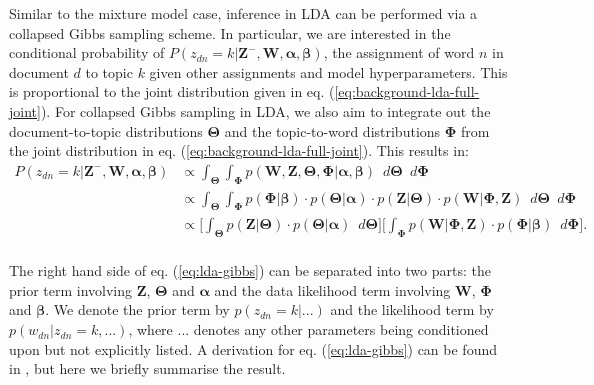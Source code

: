 Similar to the mixture model case, inference in LDA can be performed via a collapsed Gibbs sampling scheme. In particular, we are interested in the conditional probability of $P({z}_{dn}=k \vert \boldsymbol{Z}^{-}, \boldsymbol{W}, \boldsymbol{\alpha}, \boldsymbol{\beta})$, the assignment of word $n$ in document $d$ to topic $k$ given other assignments and model hyperparameters. This is proportional to the joint distribution given in eq. (\ref{eq:background-lda-full-joint}). For collapsed Gibbs sampling in LDA, we also aim to integrate out the document-to-topic distributions $\boldsymbol{\Theta}$ and the topic-to-word distributions $\boldsymbol{\Phi}$ from the joint distribution in eq. (\ref{eq:background-lda-full-joint}). This results in: 
\begin{equation}
\begin{aligned}
P({z}_{dn}=k \vert \boldsymbol{Z}^{-}, \boldsymbol{W}, \boldsymbol{\alpha}, \boldsymbol{\beta}) &\propto \int_{\boldsymbol{\Theta}} \int_{\boldsymbol{\Phi}} p(\boldsymbol{W}, \boldsymbol{Z}, \boldsymbol{\Theta}, \boldsymbol{\Phi} \vert \boldsymbol{\alpha}, \boldsymbol{\beta}) \enspace d\boldsymbol{\Theta} \enspace d\boldsymbol{\Phi} \\
                                                                                                                                                    &\propto \int_{\boldsymbol{\Theta}} \int_{\boldsymbol{\Phi}} p(\boldsymbol{\Phi} \vert \boldsymbol{\beta}) \cdot p(\boldsymbol{\Theta} \vert \boldsymbol{\alpha}) \cdot p(\boldsymbol{Z} \vert \boldsymbol{\Theta}) \cdot  p(\boldsymbol{W} \vert \boldsymbol{\Phi}, \boldsymbol{Z}) \enspace d\boldsymbol{\Theta} \enspace d\boldsymbol{\Phi} \\
                                                                                                                                                    &\propto \Bigg[ \int_{\boldsymbol{\Theta}}  p(\boldsymbol{Z} \vert \boldsymbol{\Theta}) \cdot p(\boldsymbol{\Theta} \vert \boldsymbol{\alpha}) \enspace d\boldsymbol{\Theta} \Bigg] \Bigg[\int_{\boldsymbol{\Phi}} p(\boldsymbol{W} \vert \boldsymbol{\Phi}, \boldsymbol{Z}) \cdot p(\boldsymbol{\Phi} \vert \boldsymbol{\beta}) \enspace d\boldsymbol{\Phi} \Bigg]. \\ 
\label{eq:lda-gibbs}
\end{aligned}
\end{equation}

The right hand side of eq. (\ref{eq:lda-gibbs}) can be separated into two parts: the prior term involving $\boldsymbol{Z}$, $\boldsymbol{\Theta}$ and $\boldsymbol{\alpha}$ and the data likelihood term involving $\boldsymbol{W}$, $\boldsymbol{\Phi}$ and $\boldsymbol{\beta}$. We denote the prior term by $p({z}_{dn}=k \vert ...)$ and the likelihood term by $p({w}_{dn} \vert {z}_{dn}=k, ...)$, where $...$ denotes any other parameters being conditioned upon but not explicitly listed. A derivation for eq. (\ref{eq:lda-gibbs}) can be found in \cite{carpenter2010integrating}, but here we briefly summarise the result.

